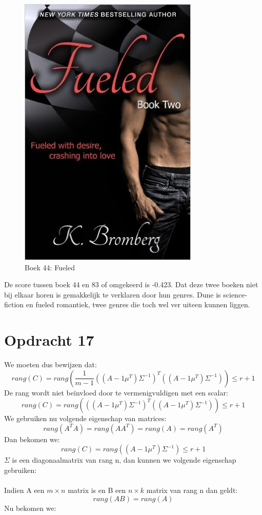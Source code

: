 \documentclass[11pt,a4paper]{article}
\begin{document}
\begin{figure}[H]
\centering
\includegraphics[scale=0.30]{dune83}
\caption{Boek 44: Fueled}
\end{figure}
De score tussen boek 44 en 83 of omgekeerd is -0.423. Dat deze twee boeken niet bij elkaar horen is gemakkelijk te verklaren door hun genres. Dune is science-fiction en fueled romantiek, twee genres die toch wel ver uiteen kunnen liggen.



\section*{Opdracht 17}

We moeten dus bewijzen dat:
$$ rang(C) = rang\left(\frac{1}{m-1}((A-1\mu^T)\Sigma^{-1})^T((A-1\mu^T)\Sigma^{-1})\right) \leq r + 1$$
De rang wordt niet beïnvloed door te vermenigvuldigen met een scalar:
$$ rang(C) = rang\left(((A-1\mu^T)\Sigma^{-1})^T((A-1\mu^T)\Sigma^{-1})\right) \leq r + 1$$
We gebruiken nu volgende eigenschap van matrices:
\begin{equation}
rang(A^TA) = rang(AA^T) = rang(A) = rang(A^T)
\end{equation}
Dan bekomen we:
$$ rang(C) = rang\left((A-1\mu^T)\Sigma^{-1}\right) \leq r + 1$$
$\Sigma$ is een diagonaalmatrix van rang n, dan kunnen we volgende eigenschap gebruiken:
\\
\\
Indien A een $m\times n$ matrix is en B een $n\times k$ matrix van rang n dan geldt:
\begin{equation}
rang(AB) = rang(A)
\end{equation}
Nu bekomen we:
\end{document}
